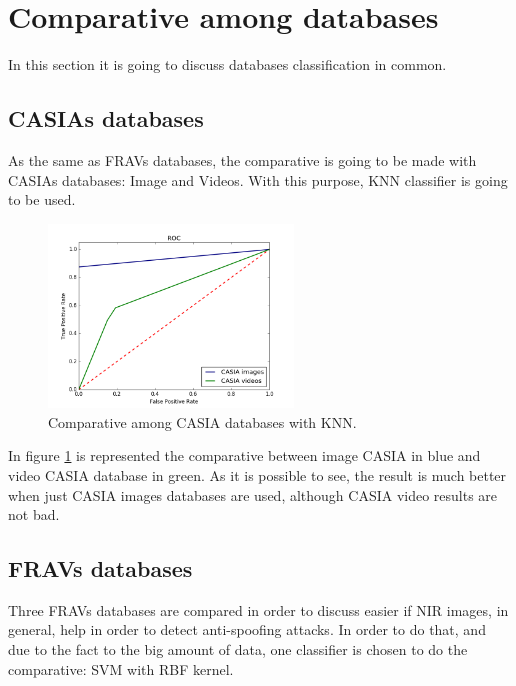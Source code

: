 \section{Comparative among databases}
In this section it is going to discuss databases classification in common.

\subsection{CASIAs databases}
As the same as FRAVs databases, the comparative is going to be made with CASIAs databases: Image and Videos. With this purpose, KNN classifier is going to be used.\\

\begin{figure}[htb]
\centering
\includegraphics[width=0.58\textwidth]{images/comparative/CASIAs_KNN_ROC.png}
\caption{Comparative among CASIA databases with KNN.} \label{fig:CASIAS_KNN_comparative}
\end{figure}

In figure \ref{fig:CASIAS_KNN_comparative} is represented the comparative between image CASIA in blue and video CASIA database in green. As it is possible to see, the result is much better when just CASIA images databases are used, although CASIA video results are not bad.

\subsection{FRAVs databases}
Three FRAVs databases are compared in order to discuss easier if NIR images, in general, help in order to detect anti-spoofing attacks. In order to do that, and due to the fact to the big amount of data, one classifier is chosen to do the comparative: SVM with RBF kernel.\\

